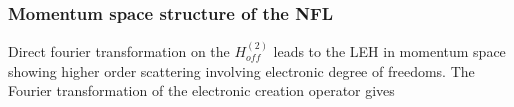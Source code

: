 \documentclass[reprint,prb,superscriptaddress]{revtex4-2}
\begin{document}
\subsubsection{Momentum space structure of the NFL}
Direct fourier transformation on the $H^{(2)}_{off}$ leads to the LEH in momentum space showing higher order scattering involving electronic degree of freedoms.
The Fourier transformation of the electronic creation operator gives
%
\end{document}
